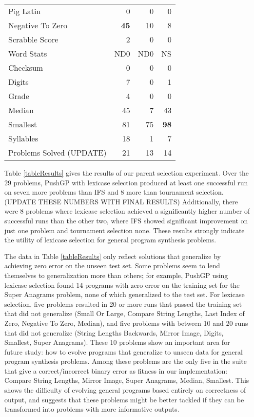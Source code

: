 \documentclass{sig-alternate}
\begin{document}
\begin{table}[t]
\begin{tabular}{|l|rrr|}
Pig Latin                  & 0        & 0       & 0   \\
Negative To Zero           & \textbf{45}       & 10      & 8   \\
Scrabble Score             & 2        & 0       & 0    \\
Word Stats                 & ND0      & ND0     &  NS   \\
Checksum                   & 0         & 0        & 0    \\
Digits                     & 7        & 0       & 1   \\
Grade                      & 4        & 0       & 0   \\
Median                     & 45       & 7       & 43  \\
Smallest                   & 81       & 75      & \textbf{98}  \\
Syllables                  & 18       & 1       & 7   \\
\hline
Problems Solved (UPDATE)           & 21       & 13      & 14   \\
\hline
\end{tabular}
\end{table}


Table \ref{tableResults} gives the results of our parent selection experiment. Over the 29 problems, PushGP with lexicase selection produced at least one successful run on seven more problems than IFS and 8 more than tournament selection.
(UPDATE THESE NUMBERS WITH FINAL RESULTS)
Additionally, there were 8 problems where lexicase selection achieved a significantly higher number of successful runs than the other two, where IFS showed significant improvement on just one problem and tournament selection none. These results strongly indicate the utility of lexicase selection for general program synthesis problems.

The data in Table \ref{tableResults} only reflect solutions that generalize by achieving zero error on the unseen test set. Some problems seem to lend themselves to generalization more than others; for example, PushGP using lexicase selection found 14 programs with zero error on the training set for the Super Anagrams problem, none of which generalized to the test set. For lexicase selection, five problems resulted in 20 or more runs that passed the training set that did not generalize (Small Or Large,
Compare String Lengths,
Last Index of Zero,
Negative To Zero,
Median),
and five problems with between 10 and 20 runs that did not generalize (String Lengths Backwards,
Mirror Image,
Digits,
Smallest,
Super Anagrams).
These 10 problems show an important area for future study: how to evolve programs that generalize to unseen data for general program synthesis problems. Among these problems are the only five in the suite that give a correct/incorrect binary error as fitness in our implementation: Compare String Lengths, Mirror Image, Super Anagrams, Median, Smallest. This shows the difficulty of evolving general programs based entirely on correctness of output, and suggests that these problems might be better tackled if they can be transformed into problems with more informative outputs.
\end{document}
